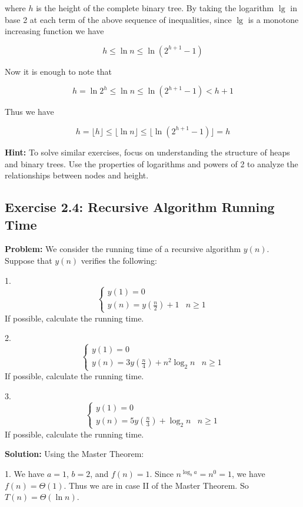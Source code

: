 where $h$ is the height of the complete binary tree. By taking the logarithm $\lg$ in base 2 at each term of the above sequence of inequalities, since $\lg$ is a monotone increasing function we have

\[ h \leq \ln n \leq \ln(2^{h+1} - 1) \]

Now it is enough to note that

\[ h = \ln 2^h \leq \ln n \leq \ln(2^{h+1} - 1) < h + 1 \]

Thus we have

\[ h = \lfloor h \rfloor \leq \lfloor \ln n \rfloor \leq \lfloor \ln(2^{h+1} - 1) \rfloor = h \]

\textbf{Hint:} To solve similar exercises, focus on understanding the structure of heaps and binary trees. Use the properties of logarithms and powers of 2 to analyze the relationships between nodes and height.

\subsection{Exercise 2.4: Recursive Algorithm Running Time}
\textbf{Problem:} We consider the running time of a recursive algorithm $y(n)$. Suppose that $y(n)$ verifies the following:

1. \[
\begin{cases}
    y(1) = 0 \\
    y(n) = y\left(\frac{n}{2}\right) + 1 & n \geq 1
\end{cases}
\]
If possible, calculate the running time.

2. \[
\begin{cases}
    y(1) = 0 \\
    y(n) = 3y\left(\frac{n}{4}\right) + n^2 \log_2 n & n \geq 1
\end{cases}
\]
If possible, calculate the running time.

3. \[
\begin{cases}
    y(1) = 0 \\
    y(n) = 5y\left(\frac{n}{3}\right) + \log_2 n & n \geq 1
\end{cases}
\]
If possible, calculate the running time.

\vspace{0.5em}
\textbf{Solution:} Using the Master Theorem:

1. We have $a = 1$, $b = 2$, and $f(n) = 1$. Since $n^{\log_b a} = n^0 = 1$, we have $f(n) = \Theta(1)$. Thus we are in case II of the Master Theorem. So $T(n) = \Theta(\ln n)$.

